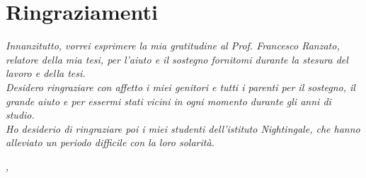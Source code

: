 
\cleardoublepage
{}
{}

\bigskip

\begingroup
\let\clearpage\relax
\let\cleardoublepage\relax
\let\cleardoublepage\relax

\chapter*{Ringraziamenti}

\noindent \textit{Innanzitutto, vorrei esprimere la mia gratitudine al Prof. Francesco Ranzato, relatore della mia tesi, per l'aiuto e il sostegno fornitomi durante la stesura del lavoro e della tesi.}\\

\noindent \textit{Desidero ringraziare con affetto i miei genitori e tutti i parenti per il sostegno, il grande aiuto e per essermi stati vicini in ogni momento durante gli anni di studio.}\\

\noindent \textit{Ho desiderio di ringraziare poi i miei studenti dell'istituto Nightingale, che hanno alleviato un periodo difficile con la loro solarità.}\\
\bigskip

\noindent\textit{\myLocation, \myTime}
\hfill \myName

\endgroup

